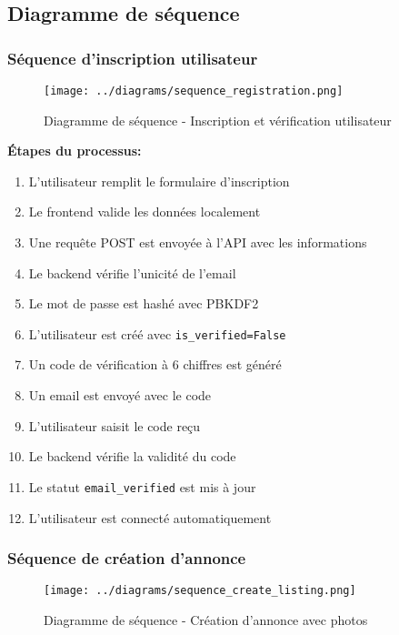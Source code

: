 \subsection{Diagramme de séquence}

\subsubsection{Séquence d'inscription utilisateur}

\begin{figure}[H]
\centering
\texttt{[image: ../diagrams/sequence\_registration.png]}
\caption{Diagramme de séquence - Inscription et vérification utilisateur}
\label{fig:seq_registration}
\end{figure}

\textbf{Étapes du processus:}
\begin{enumerate}
    \item L'utilisateur remplit le formulaire d'inscription
    \item Le frontend valide les données localement
    \item Une requête POST est envoyée à l'API avec les informations
    \item Le backend vérifie l'unicité de l'email
    \item Le mot de passe est hashé avec PBKDF2
    \item L'utilisateur est créé avec \texttt{is\_verified=False}
    \item Un code de vérification à 6 chiffres est généré
    \item Un email est envoyé avec le code
    \item L'utilisateur saisit le code reçu
    \item Le backend vérifie la validité du code
    \item Le statut \texttt{email\_verified} est mis à jour
    \item L'utilisateur est connecté automatiquement
\end{enumerate}

\subsubsection{Séquence de création d'annonce}

\begin{figure}[H]
\centering
\texttt{[image: ../diagrams/sequence\_create\_listing.png]}
\caption{Diagramme de séquence - Création d'annonce avec photos}
\label{fig:seq_listing}
\end{figure}


